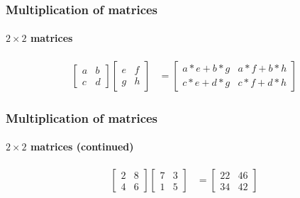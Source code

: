 \documentclass[xcolor=dvipsnames]{beamer}
\begin{document}
\begin{frame}
\frametitle{Multiplication of matrices}
\framesubtitle{$2 \times 2$ matrices}

  \begin{align*}
    \left[ \begin{array}{rr}
      a & b \\
      c & d
      \end{array} \right]
    \left[ \begin{array}{rr}
      e & f \\
      g & h
      \end{array} \right]
    & = 
    \left[ \begin{array}{rr}
      a*e + b*g & a*f + b*h \\
      c*e + d*g & c*f + d*h
      \end{array} \right]
    \end{align*}

  \end{frame}

\begin{frame}
\frametitle{Multiplication of matrices}
\framesubtitle{$2 \times 2$ matrices (continued)}

  \begin{align*}
    \left[ \begin{array}{rr}
      2 & 8 \\
      4 & 6
      \end{array} \right]
    \left[ \begin{array}{rr}
      7 & 3 \\
      1 & 5
      \end{array} \right]
    & = 
    \left[ \begin{array}{rr}
      22 & 46 \\
      34 & 42
      \end{array} \right]
    \end{align*}

  \end{frame}
\end{document}

